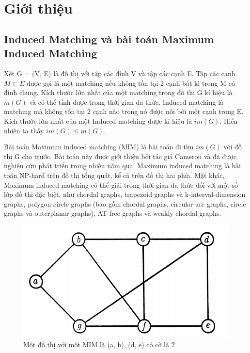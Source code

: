 \documentclass[14pt,a4paper]{extreport}
\begin{document}
\tableofcontents 
\newpage
\setlength{\parindent}{4em}
\setlength{\parskip}{1em}
\renewcommand{\baselinestretch}{1.5}



\chapter{Giới thiệu}
\section{Induced Matching và bài toán Maximum Induced Matching}

Xét G = (V, E) là đồ thị với tập các đỉnh V và tập các cạnh E. Tập các cạnh $ M \subset E $ được gọi là một matching nếu không tồn tại 2 cạnh bất kì trong M có đỉnh chung. Kích thước lớn nhất của một matching trong đồ thị G kí hiệu là$  m(G) $ và có thể tính được trong thời gian đa thức. Induced matching  là matching mà không tồn tại 2 cạnh nào trong nó được nối bởi một cạnh trong E. Kích thước lớn nhất của một Induced matching được kí hiệu là $ im(G) $. Hiển nhiên ta thấy $ im(G) \leq m(G) $. 

Bài toán Maximum induced matching (MIM) là bài toán đi tìm $ im(G) $ với đồ thị G cho trước.  Bài toán này được giới thiệu bởi tác giả Cameron và đã được nghiên cứu phát triển trong nhiều năm qua. Maximum induced matching là bài toán NP-hard trên đồ thị tổng quát, kể cả trên đồ thị hai phía. Mặt khác, Maximum induced matching có thể giải trong thời gian đa thức đối với một số lớp đồ thị đặc biệt, như chordal graphs, trapezoid graphs và k-interval-dimension graphs, polygon-circle graphs (bao gồm chordal graphs, circular-arc graphs, circle graphs và outerplanar graphs), AT-free graphs và weakly chordal graphs.

\begin{figure}
	\centering
	\includegraphics[scale=.39]{mim}
	\caption{Một đồ thị với một MIM là {(a, b), (d, e)} có cỡ là 2}
\end{figure}
\end{document}
